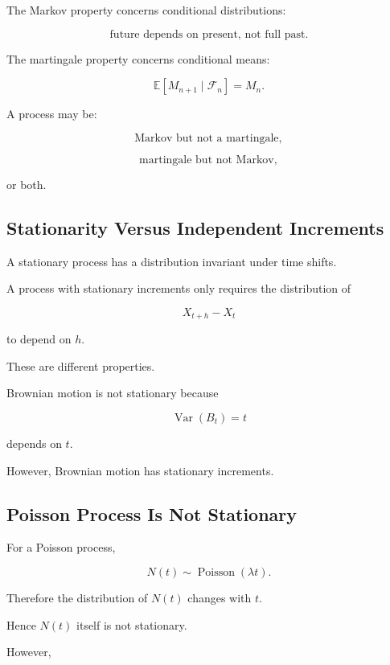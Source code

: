 The Markov property concerns conditional distributions:

\[
\boxed{
\text{future depends on present, not full past}.
}
\]

The martingale property concerns conditional means:

\[
\boxed{
\mathbb{E}[M_{n+1}\mid\mathcal{F}_n]
=
M_n.
}
\]

A process may be:

\[
\text{Markov but not a martingale},
\]

\[
\text{martingale but not Markov},
\]

or both.

\subsection{Stationarity Versus Independent Increments}
\label{subsec:stationarity-versus-increments}

A stationary process has a distribution invariant under time shifts.

A process with stationary increments only requires the distribution of

\[
X_{t+h}-X_t
\]

to depend on \(h\).

These are different properties.

Brownian motion is not stationary because

\[
\operatorname{Var}(B_t)=t
\]

depends on \(t\).

However, Brownian motion has stationary increments.

\subsection{Poisson Process Is Not Stationary}
\label{subsec:poisson-not-stationary}

For a Poisson process,

\[
N(t)
\sim
\operatorname{Poisson}(\lambda t).
\]

Therefore the distribution of \(N(t)\) changes with \(t\).

Hence \(N(t)\) itself is not stationary.

However,

